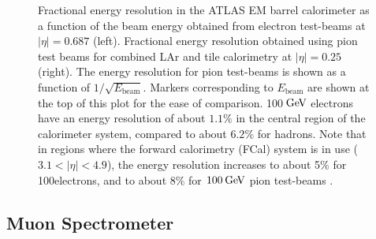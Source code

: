 \begin{figure}[t]
    \begin{minipage}{6in}
        \centering
        \hspace*{.2in}
        \centering
    \end{minipage}
    \caption{Fractional energy resolution in the ATLAS EM barrel calorimeter as a function of the beam energy obtained from electron test-beams at $|\eta| = 0.687$ (left). Fractional energy resolution obtained using pion test beams for combined LAr and tile calorimetry at $|\eta|=0.25$ (right). The energy resolution for pion test-beams is shown as a function of $1/\sqrt{E_{\text{beam}}}$. Markers corresponding to $E_{\text{beam}}$ are shown at the top of this plot for the ease of comparison. 100$\hspace{2pt}\text{Ge\kern -0.1em V}$ electrons have an energy resolution of about $1.1\%$ in the central region of the calorimeter system, compared to about $6.2\%$ for hadrons. Note that in regions where the forward calorimetry (FCal) system is in use ($3.1 < |\eta| < 4.9$), the energy resolution increases to about 5$\%$ for 100\GeV electrons, and to about $8\%$ for $100\hspace{2pt}\text{Ge\kern -0.1em V}$ pion test-beams \cite{Atlas:EMCalo,Atlas:design}.\label{fig:energyres}}
\end{figure}

\subsection{Muon Spectrometer}

